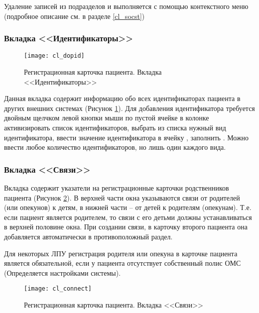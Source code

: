 Удаление записей из подразделов  и  выполняется с помощью контекстного меню (подробное описание см. в разделе \ref{cl_socst})

\subsubsection{Вкладка <<Идентификаторы>>}

\begin{figure}[ht!]\centering
 \texttt{[image: cl\_dopid]}
 \caption{Регистрационная карточка пациента. Вкладка <<Идентификаторы>>}
 \label{img_cl_dopid}
\end{figure} 

Данная вкладка содержит информацию обо всех идентификаторах пациента в других внешних системах (Рисунок \ref{img_cl_dopid}). Для добавления идентификатора требуется двойным щелчком левой кнопки мыши по пустой ячейке в колонке  активизировать список идентификаторов, выбрать из списка нужный вид идентификатора, ввести значение идентификатора в ячейку , заполнить . Можно ввести любое количество идентификаторов, но лишь один каждого вида. 

\subsubsection{Вкладка <<Связи>>}

Вкладка  содержит указатели на регистрационные карточки родственников пациента (Рисунок \ref{img_cl_connect}). В верхней части окна указываются связи от родителей (или опекунов) к детям, в нижней части – от детей к родителям (опекунам). Т.е. если пациент является родителем, то связи с его детьми должны устанавливаться в верхней половине окна. При создании связи, в карточку второго пациента она добавляется автоматически в противоположный раздел.

\begin{prim}
 Для некоторых ЛПУ регистрация родителя или опекуна в карточке пациента является обязательной, если у пациента отсутствует собственный полис ОМС (Определяется настройками системы).
\end{prim}

\begin{figure}[ht!]\centering
 \texttt{[image: cl\_connect]}
 \caption{Регистрационная карточка пациента. Вкладка <<Связи>>}
 \label{img_cl_connect}
\end{figure} 

